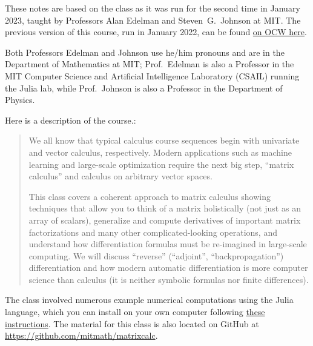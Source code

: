 These notes are based on the class as it was run for the second time in January 2023, taught by Professors Alan Edelman and Steven~G.~Johnson at MIT. The previous version of this course, run in January 2022, can be found \href{https://ocw.mit.edu/courses/18-s096-matrix-calculus-for-machine-learning-and-beyond-january-iap-2022/}{on OCW here}. 

Both Professors Edelman and Johnson use he/him pronouns and are in the Department of Mathematics at MIT; Prof.~Edelman is also a Professor in the MIT Computer Science and Artificial Intelligence Laboratory (CSAIL) running the Julia lab, while Prof.~Johnson is also a Professor in the Department of Physics. 

Here is a description of the course.:
\begin{quote}
    We all know that typical  calculus course sequences 
    begin with  univariate and vector calculus, respectively. Modern applications such as machine learning and large-scale optimization require the next big step, ``matrix calculus'' and calculus on arbitrary vector spaces.



This class covers a coherent approach to matrix calculus showing techniques that allow you to think of a matrix holistically (not just as an array of scalars), generalize and compute derivatives of important matrix factorizations and many other complicated-looking operations, and understand how differentiation formulas must be re-imagined in large-scale computing. We will discuss ``reverse'' (``adjoint'', ``backpropagation'') differentiation and how modern automatic differentiation is more computer science than calculus (it is neither symbolic formulas nor finite differences).
\end{quote}
The class involved numerous example numerical computations using the Julia language, which you can install on your own computer following \href{https://github.com/mitmath/julia-mit#installing-julia-and-ijulia-on-your-own-computer}{these instructions}. The material for this class is also located on GitHub at  \url{https://github.com/mitmath/matrixcalc}.